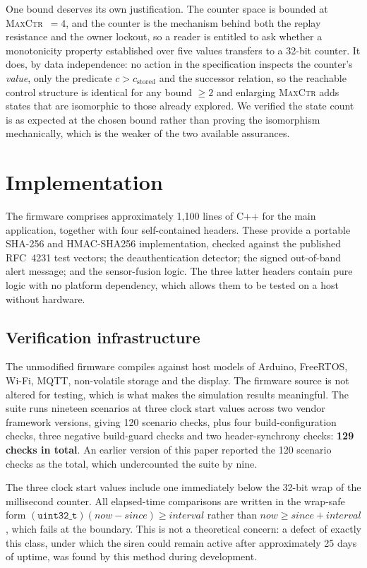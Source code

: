 One bound deserves its own justification. The counter space is bounded at
\textsc{MaxCtr}~$= 4$, and the counter is the mechanism behind both the replay resistance and the
owner lockout, so a reader is entitled to ask whether a monotonicity property established over
five values transfers to a 32-bit counter. It does, by data independence: no action in the
specification inspects the counter's \emph{value}, only the predicate $c > c_{\text{stored}}$ and
the successor relation, so the reachable control structure is identical for any bound $\ge 2$ and
enlarging \textsc{MaxCtr} adds states that are isomorphic to those already explored. We verified
the state count is as expected at the chosen bound rather than proving the isomorphism mechanically,
which is the weaker of the two available assurances.

\section{Implementation}\label{sec:impl}

The firmware comprises approximately 1{,}100 lines of C++ for the main application, together
with four self-contained headers. These provide a portable SHA-256 and HMAC-SHA256
implementation, checked against the published RFC~4231 test vectors; the deauthentication
detector; the signed out-of-band alert message; and the sensor-fusion logic. The three latter headers contain pure logic with no platform
dependency, which allows them to be tested on a host without hardware.

\subsection{Verification infrastructure}

The unmodified firmware compiles against host models of Arduino, FreeRTOS, Wi-Fi, MQTT,
non-volatile storage and the display. The firmware source is not altered for testing, which is
what makes the simulation results meaningful. The suite runs nineteen scenarios at three clock
start values across two vendor framework versions, giving 120 scenario checks, plus four
build-configuration checks, three negative build-guard checks and two header-synchrony checks:
\textbf{129 checks in total}. An earlier version of this paper reported the 120 scenario checks as
the total, which undercounted the suite by nine.

The three clock start values include one immediately below the 32-bit wrap of the millisecond
counter. All elapsed-time comparisons are written in the wrap-safe form
$(\texttt{uint32\_t})(\mathit{now} - \mathit{since}) \ge \mathit{interval}$ rather than
$\mathit{now} \ge \mathit{since} + \mathit{interval}$, which fails at the boundary. This is not a
theoretical concern: a defect of exactly this class, under which the siren could remain active
after approximately 25 days of uptime, was found by this method during development.

